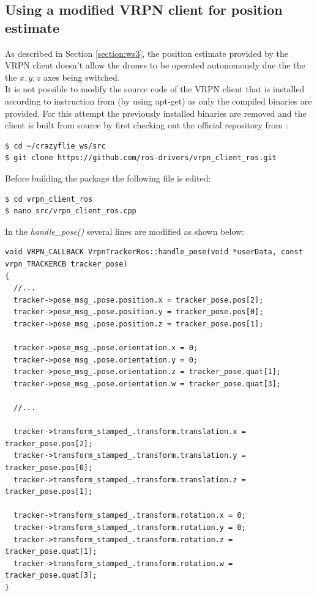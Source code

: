 \subsection{Using a modified VRPN client for position estimate}
As described in Section \ref{section:ws3}, the position estimate provided by the VRPN client doesn't allow the drones to be operated autonomously due the the the $x,y,z$ axes being switched.\\
\noindent It is not possible to modify the source code of the VRPN client that is installed according to instruction from \cite{HoenigMixedReality2015} (by using apt-get) as only the compiled binaries are provided. For this attempt the previously installed binaries are removed and the client is built from source by first checking out the official repository from \cite{web_vrpn_git}:
\begin{verbatim}
$ cd ~/crazyflie_ws/src
$ git clone https://github.com/ros-drivers/vrpn_client_ros.git
\end{verbatim}

\noindent Before building the package the following file is edited:
\begin{verbatim}
$ cd vrpn_client_ros
$ nano src/vrpn_client_ros.cpp
\end{verbatim}

\noindent In the \textit{handle\_pose()} several lines are modified as shown below:
\begin{verbatim}
void VRPN_CALLBACK VrpnTrackerRos::handle_pose(void *userData, const vrpn_TRACKERCB tracker_pose)
{
  //...
  tracker->pose_msg_.pose.position.x = tracker_pose.pos[2];
  tracker->pose_msg_.pose.position.y = tracker_pose.pos[0];
  tracker->pose_msg_.pose.position.z = tracker_pose.pos[1];
  
  tracker->pose_msg_.pose.orientation.x = 0;
  tracker->pose_msg_.pose.orientation.y = 0;
  tracker->pose_msg_.pose.orientation.z = tracker_pose.quat[1];
  tracker->pose_msg_.pose.orientation.w = tracker_pose.quat[3];
  
  //...
  
  tracker->transform_stamped_.transform.translation.x = tracker_pose.pos[2];
  tracker->transform_stamped_.transform.translation.y = tracker_pose.pos[0];
  tracker->transform_stamped_.transform.translation.z = tracker_pose.pos[1];
  
  tracker->transform_stamped_.transform.rotation.x = 0;
  tracker->transform_stamped_.transform.rotation.y = 0;
  tracker->transform_stamped_.transform.rotation.z = tracker_pose.quat[1];
  tracker->transform_stamped_.transform.rotation.w = tracker_pose.quat[3];
}
\end{verbatim}

